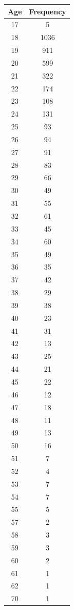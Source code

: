 \documentclass[
]{article}
\begin{document}
\begin{table}
\centering
\begin{tabular}{c|c}
\hline
Age & Frequency\\
\hline
17 & 5\\
\hline
18 & 1036\\
\hline
19 & 911\\
\hline
20 & 599\\
\hline
21 & 322\\
\hline
22 & 174\\
\hline
23 & 108\\
\hline
24 & 131\\
\hline
25 & 93\\
\hline
26 & 94\\
\hline
27 & 91\\
\hline
28 & 83\\
\hline
29 & 66\\
\hline
30 & 49\\
\hline
31 & 55\\
\hline
32 & 61\\
\hline
33 & 45\\
\hline
34 & 60\\
\hline
35 & 49\\
\hline
36 & 35\\
\hline
37 & 42\\
\hline
38 & 29\\
\hline
39 & 38\\
\hline
40 & 23\\
\hline
41 & 31\\
\hline
42 & 13\\
\hline
43 & 25\\
\hline
44 & 21\\
\hline
45 & 22\\
\hline
46 & 12\\
\hline
47 & 18\\
\hline
48 & 11\\
\hline
49 & 13\\
\hline
50 & 16\\
\hline
51 & 7\\
\hline
52 & 4\\
\hline
53 & 7\\
\hline
54 & 7\\
\hline
55 & 5\\
\hline
57 & 2\\
\hline
58 & 3\\
\hline
59 & 3\\
\hline
60 & 2\\
\hline
61 & 1\\
\hline
62 & 1\\
\hline
70 & 1\\
\hline
\end{tabular}
\end{table}
\end{document}
